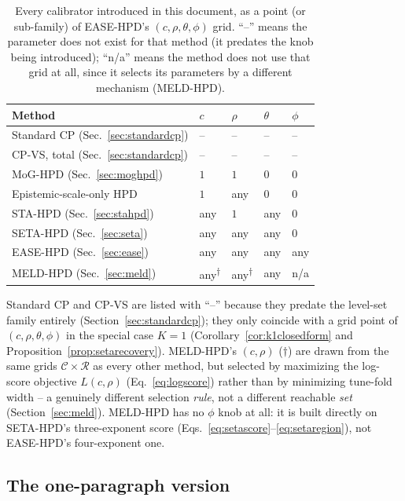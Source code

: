 \documentclass[11pt]{article}
\begin{document}
\begin{table}[h]
\centering
\caption{Every calibrator introduced in this document, as a point (or sub-family) of EASE-HPD's
$(c,\rho,\theta,\phi)$ grid. ``--'' means the parameter does not exist for that method (it predates
the knob being introduced); ``n/a'' means the method does not use that grid at all, since it
selects its parameters by a different mechanism (MELD-HPD).}
\label{tab:cheatsheet}
\begin{tabular}{@{}lllll@{}}
\toprule
\textbf{Method} & $c$ & $\rho$ & $\theta$ & $\phi$ \\
\midrule
Standard CP (Sec.~\ref{sec:standardcp}) & -- & -- & -- & -- \\
CP-VS, total (Sec.~\ref{sec:standardcp}) & -- & -- & -- & -- \\
MoG-HPD (Sec.~\ref{sec:moghpd}) & $1$ & $1$ & $0$ & $0$ \\
Epistemic-scale-only HPD & $1$ & any & $0$ & $0$ \\
STA-HPD (Sec.~\ref{sec:stahpd}) & any & $1$ & any & $0$ \\
SETA-HPD (Sec.~\ref{sec:seta}) & any & any & any & $0$ \\
EASE-HPD (Sec.~\ref{sec:ease}) & any & any & any & any \\
MELD-HPD (Sec.~\ref{sec:meld}) & any\textsuperscript{$\dagger$} & any\textsuperscript{$\dagger$} &
any & n/a \\
\bottomrule
\end{tabular}
\end{table}

Standard CP and CP-VS are listed with ``--'' because they predate the level-set family entirely
(Section~\ref{sec:standardcp}); they only coincide with a grid point of $(c,\rho,\theta,\phi)$ in
the special case $K=1$ (Corollary~\ref{cor:k1closedform} and Proposition~\ref{prop:setarecovery}).
MELD-HPD's $(c,\rho)$ ($\dagger$) are drawn from the same grids $\mathcal C\times\mathcal R$ as
every other method, but selected by maximizing the log-score objective $L(c,\rho)$
(Eq.~\ref{eq:logscore}) rather than by minimizing tune-fold width -- a genuinely different
selection \emph{rule}, not a different reachable \emph{set} (Section~\ref{sec:meld}). MELD-HPD has
no $\phi$ knob at all: it is built directly on SETA-HPD's three-exponent score
(Eqs.~\ref{eq:setascore}--\ref{eq:setaregion}), not EASE-HPD's four-exponent one.

\subsection{The one-paragraph version}
\end{document}
